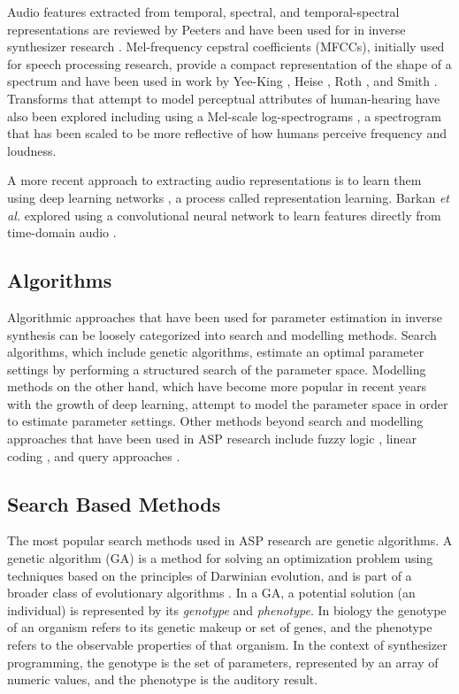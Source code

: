 Audio features extracted from temporal, spectral, and temporal-spectral representations are reviewed by Peeters \cite{peeters2004large} and have been used for in inverse synthesizer research \cite{mintz2007toward, stowell2010making, mcartwright2014, blancas2014sound}. Mel-frequency cepstral coefficients (MFCCs), initially used for speech processing research, provide a compact representation of the shape of a spectrum and have been used in work by Yee-King \cite{yee2008synthbot}, Heise \cite{ heise2009automatic}, Roth \cite{roth2011comparison}, and Smith \cite{smith2017play}. Transforms that attempt to model perceptual attributes of human-hearing have also been explored including using a Mel-scale log-spectrograms \cite{zhang2018visualization}, a spectrogram that has been scaled to be more reflective of how humans perceive frequency and loudness.

A more recent approach to extracting audio representations is to learn them using deep learning networks \cite{bengio2013representation}, a process called representation learning. Barkan \textit{et al.} explored using a convolutional neural network to learn features directly from time-domain audio \cite{barkan2019inversynth}.


\subsection{Algorithms}
Algorithmic approaches that have been used for parameter estimation in inverse synthesis can be loosely categorized into search and modelling methods. Search algorithms, which include genetic algorithms, estimate an optimal parameter settings by performing a structured search of the parameter space. Modelling methods on the other hand, which have become more popular in recent years with the growth of deep learning, attempt to model the parameter space in order to estimate parameter settings. Other methods beyond search and modelling approaches that have been used in ASP research include fuzzy logic \cite{mitchell2005frequency, hamadicharef2012intelligent}, linear coding \cite{mintz2007toward}, and query approaches \cite{mcartwright2014}.

\subsection{Search Based Methods}
The most popular search methods used in ASP research are genetic algorithms. A genetic algorithm (GA) is a method for solving an optimization problem using techniques based on the principles of Darwinian evolution, and is part of a broader class of evolutionary algorithms \cite{whitley1994genetic}. In a GA, a potential solution (an individual) is represented by its \textit{genotype} and \textit{phenotype}. In biology the genotype of an organism refers to its genetic makeup or set of genes, and the phenotype refers to the observable properties of that organism. In the context of synthesizer programming, the genotype is the set of parameters, represented by an array of numeric values, and the phenotype is the auditory result. 

